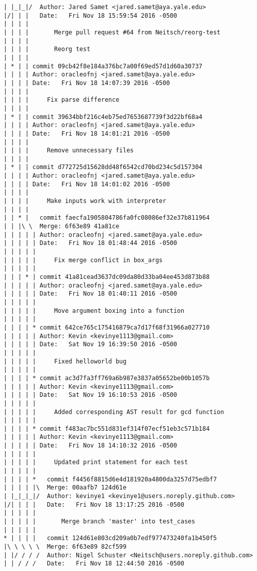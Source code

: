 \begin{lstlisting}
| |_|_|/  Author: Jared Samet <jared.samet@aya.yale.edu>
|/| | |   Date:   Fri Nov 18 15:59:54 2016 -0500
| | | |   
| | | |       Merge pull request #64 from Neitsch/reorg-test
| | | |       
| | | |       Reorg test
| | | |     
| * | | commit 09cb42f8e184a376bc7a00f69ed57d1d60a30737
| | | | Author: oracleofnj <jared.samet@aya.yale.edu>
| | | | Date:   Fri Nov 18 14:07:39 2016 -0500
| | | | 
| | | |     Fix parse difference
| | | |     
| * | | commit 39634bbf216c4eb75ed7653687739f3d22bf68a4
| | | | Author: oracleofnj <jared.samet@aya.yale.edu>
| | | | Date:   Fri Nov 18 14:01:21 2016 -0500
| | | | 
| | | |     Remove unnecessary files
| | | |     
| * | | commit d772725d15628dd48f6542cd70bd234c5d157304
| | | | Author: oracleofnj <jared.samet@aya.yale.edu>
| | | | Date:   Fri Nov 18 14:01:02 2016 -0500
| | | | 
| | | |     Make inputs work with interpreter
| | | |       
| | * |   commit faecfa1905804786fa0fc08086ef32e37b811964
| | |\ \  Merge: 6f63e89 41a81ce
| | | | | Author: oracleofnj <jared.samet@aya.yale.edu>
| | | | | Date:   Fri Nov 18 01:48:44 2016 -0500
| | | | | 
| | | | |     Fix merge conflict in box_args
| | | | |      
| | | * | commit 41a81cead3637dc09da80d33ba04ee453d873b88
| | | | | Author: oracleofnj <jared.samet@aya.yale.edu>
| | | | | Date:   Fri Nov 18 01:40:11 2016 -0500
| | | | | 
| | | | |     Move argument boxing into a function
| | | | |      
| | | | * commit 642ce765c175416879ca7d17f68f31966a027710
| | | | | Author: Kevin <kevinye1113@gmail.com>
| | | | | Date:   Sat Nov 19 16:39:50 2016 -0500
| | | | | 
| | | | |     Fixed helloworld bug
| | | | |      
| | | | * commit ac3d7fa3ff769a6b987e3837a05652be00b1057b
| | | | | Author: Kevin <kevinye1113@gmail.com>
| | | | | Date:   Sat Nov 19 16:10:53 2016 -0500
| | | | | 
| | | | |     Added corresponding AST result for gcd function
| | | | |      
| | | | * commit f483ac7bc551d831ef314f07ecf51eb3c571b184
| | | | | Author: Kevin <kevinye1113@gmail.com>
| | | | | Date:   Fri Nov 18 14:10:32 2016 -0500
| | | | | 
| | | | |     Updated print statement for each test
| | | | |        
| | | | *   commit f4456f8815d6e4d181920a4800da3257d75edbf7
| | | | |\  Merge: 00aafb7 124d61e
| |_|_|_|/  Author: kevinye1 <kevinye1@users.noreply.github.com>
|/| | | |   Date:   Fri Nov 18 13:17:25 2016 -0500
| | | | |   
| | | | |       Merge branch 'master' into test_cases
| | | | |        
* | | | |   commit 124d61e803cd209a0b7edf977473240fa1b450f5
|\ \ \ \ \  Merge: 6f63e89 82cf599
| |/ / / /  Author: Nigel Schuster <Neitsch@users.noreply.github.com>
| | / / /   Date:   Fri Nov 18 12:44:50 2016 -0500

\end{lstlisting}
